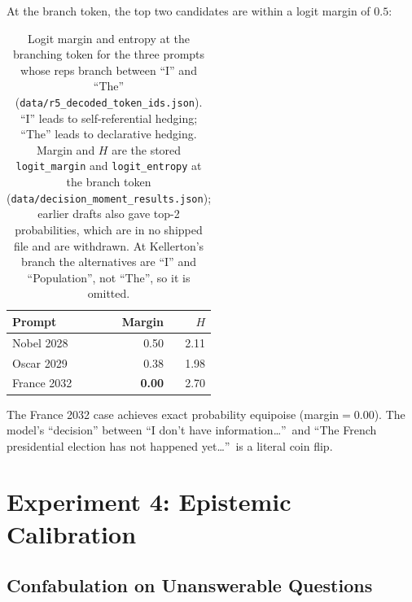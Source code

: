 \documentclass[11pt,a4paper]{article}
\begin{document}
At the branch token, the top two candidates are within a logit margin of $0.5$:

\begin{table}[H]
\centering
\caption{Logit margin and entropy at the branching token for
the three prompts whose reps branch between ``I'' and ``The'' (\texttt{data/r5\_decoded\_token\_ids.json}). ``I'' leads to self-referential hedging;
``The'' leads to declarative hedging. Margin and $H$ are the stored \texttt{logit\_margin} and \texttt{logit\_entropy} at the branch token (\texttt{data/decision\_moment\_results.json}); earlier drafts also gave top-2 probabilities, which are in no shipped file and are withdrawn. At Kellerton's branch the alternatives are ``I'' and ``Population'', not ``The'', so it is omitted.}
\label{tab:topk}
\begin{tabular}{lrr}
\toprule
Prompt & Margin & $H$ \\
\midrule
Nobel 2028 & 0.50 & 2.11 \\
Oscar 2029 & 0.38 & 1.98 \\
France 2032 & \textbf{0.00} & 2.70 \\
\bottomrule
\end{tabular}
\end{table}

The France 2032 case achieves exact probability equipoise
(margin${=}0.00$). The model's ``decision'' between ``I don't have
information\ldots''\ and ``The French presidential election has not
happened yet\ldots''\ is a literal coin flip.

\section{Experiment 4: Epistemic Calibration}
\label{sec:calibration}

\subsection{Confabulation on Unanswerable Questions}
\end{document}

